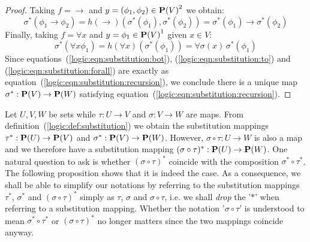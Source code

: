 \begin{proof}
Taking $f=\to$ and $y=(\phi_{1},\phi_{2})\in\mbox{${\bf P}(V)$}^{2}$ we obtain:
    \begin{equation}\label{logic:eqn:substitution:to}
    \sigma^{*}(\phi_{1}\to\phi_{2})=h(\to)(\sigma^{*}(\phi_{1}),\sigma^{*}(\phi_{2}))
    =\sigma^{*}(\phi_{1})\to\sigma^{*}(\phi_{2})
    \end{equation}
Finally, taking $f=\forall x$ and $y=\phi_{1}\in\mbox{${\bf P}(V)$}^{1}$ given $x\in V$:
    \begin{equation}\label{logic:eqn:substitution:forall}
    \sigma^{*}(\forall x\phi_{1})=h(\forall x)(\sigma^{*}(\phi_{1}))
    =\forall\sigma(x)\,\sigma^{*}(\phi_{1})
    \end{equation}
Since equations~(\ref{logic:eqn:substitution:bot}),
(\ref{logic:eqn:substitution:to}) and
(\ref{logic:eqn:substitution:forall}) are exactly as
equation~(\ref{logic:eqn:substitution:recursion}), we conclude there
is a unique map $\sigma^{*}:\mbox{${\bf P}(V)$}\to{\bf P}(W)$ satisfying
equation~(\ref{logic:eqn:substitution:recursion}).
\end{proof}

Let $U,V,W$ be sets while $\tau:U\to V$ and $\sigma:V\to W$ are
maps. From definition~(\ref{logic:def:substitution}) we obtain the
substitution mappings $\tau^{*}:{\bf P}(U)\to\mbox{${\bf P}(V)$}$ and
$\sigma^{*}:\mbox{${\bf P}(V)$}\to{\bf P}(W)$. However, $\sigma\circ\tau:U\to W$ is
also a map and we therefore have a substitution mapping
$(\sigma\circ\tau)^{*}:{\bf P}(U)\to{\bf P}(W)$. One natural
question to ask is whether $(\sigma\circ\tau)^{*}$ coincide with the
composition $\sigma^{*}\circ\tau^{*}$. The following proposition
shows that it is indeed the case. As a consequence, we shall be able
to simplify our notations by referring to the substitution mappings
$\tau^{*}$, $\sigma^{*}$ and $(\sigma\circ\tau)^{*}$ simply as
$\tau$, $\sigma$ and $\sigma\circ\tau$, i.e.  we shall {\em drop}
the '$*$' when referring to a substitution mapping. Whether the
notation '$\sigma\circ\tau$' is understood to mean
$\sigma^{*}\circ\tau^{*}$ or $(\sigma\circ\tau)^{*}$ no longer
matters since the two mappings coincide anyway.

